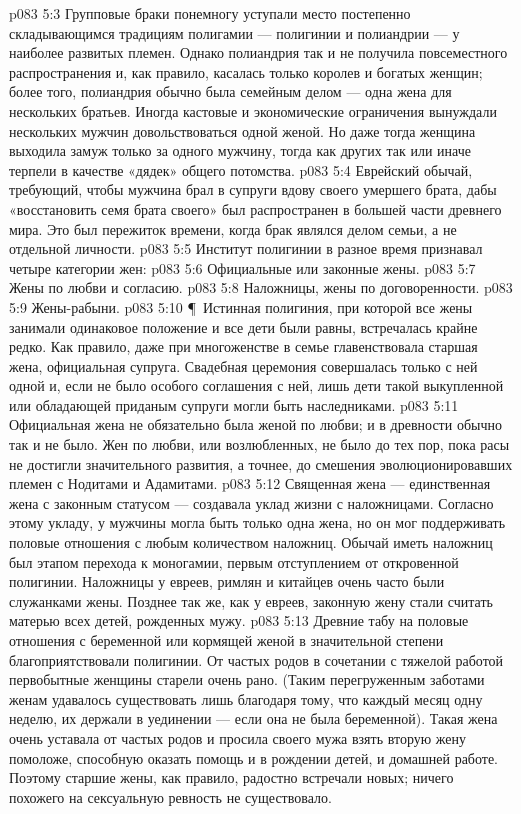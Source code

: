 \vs p083 5:3 Групповые браки понемногу уступали место постепенно складывающимся традициям полигамии --- полигинии и полиандрии --- у наиболее развитых племен. Однако полиандрия так и не получила повсеместного распространения и, как правило, касалась только королев и богатых женщин; более того, полиандрия обычно была семейным делом --- одна жена для нескольких братьев. Иногда кастовые и экономические ограничения вынуждали нескольких мужчин довольствоваться одной женой. Но даже тогда женщина выходила замуж только за одного мужчину, тогда как других так или иначе терпели в качестве «дядек» общего потомства.
\vs p083 5:4 Еврейский обычай, требующий, чтобы мужчина брал в супруги вдову своего умершего брата, дабы «восстановить семя брата своего» был распространен в большей части древнего мира. Это был пережиток времени, когда брак являлся делом семьи, а не отдельной личности.
\vs p083 5:5 Институт полигинии в разное время признавал четыре категории жен:
\vs p083 5:6 \bibnobreakspace Официальные или законные жены.
\vs p083 5:7 \bibnobreakspace Жены по любви и согласию.
\vs p083 5:8 \bibnobreakspace Наложницы, жены по договоренности.
\vs p083 5:9 \bibnobreakspace Жены\hyp{}рабыни.
\vs p083 5:10 \P\ Истинная полигиния, при которой все жены занимали одинаковое положение и все дети были равны, встречалась крайне редко. Как правило, даже при многоженстве в семье главенствовала старшая жена, официальная супруга. Свадебная церемония совершалась только с ней одной и, если не было особого соглашения с ней, лишь дети такой выкупленной или обладающей приданым супруги могли быть наследниками.
\vs p083 5:11 Официальная жена не обязательно была женой по любви; и в древности обычно так и не было. Жен по любви, или возлюбленных, не было до тех пор, пока расы не достигли значительного развития, а точнее, до смешения эволюционировавших племен с Нодитами и Адамитами.
\vs p083 5:12 Священная жена --- единственная жена с законным статусом --- создавала уклад жизни с наложницами. Согласно этому укладу, у мужчины могла быть только одна жена, но он мог поддерживать половые отношения с любым количеством наложниц. Обычай иметь наложниц был этапом перехода к моногамии, первым отступлением от откровенной полигинии. Наложницы у евреев, римлян и китайцев очень часто были служанками жены. Позднее так же, как у евреев, законную жену стали считать матерью всех детей, рожденных мужу.
\vs p083 5:13 Древние табу на половые отношения с беременной или кормящей женой в значительной степени благоприятствовали полигинии. От частых родов в сочетании с тяжелой работой первобытные женщины старели очень рано. (Таким перегруженным заботами женам удавалось существовать лишь благодаря тому, что каждый месяц одну неделю, их держали в уединении --- если она не была беременной). Такая жена очень уставала от частых родов и просила своего мужа взять вторую жену помоложе, способную оказать помощь и в рождении детей, и домашней работе. Поэтому старшие жены, как правило, радостно встречали новых; ничего похожего на сексуальную ревность не существовало.
